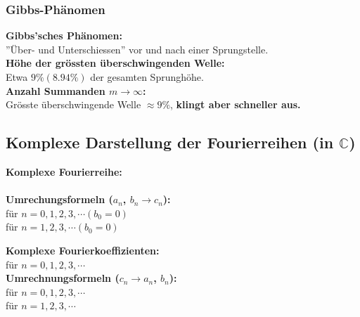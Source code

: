 			\subsubsection{Gibbs-Phänomen}
				\begin{minipage}[t]{0.65\textwidth}
					\textbf{Gibbs'sches Phänomen:}\\[3pt]
					''Über- und Unterschiessen'' vor und nach einer Sprungstelle.\\[3pt]
					\textbf{Höhe der grössten überschwingenden Welle:}\\[3pt]
					Etwa $9\% (8.94\%)$ der gesamten Sprunghöhe.\\[3pt]
					\textbf{Anzahl Summanden $m \rightarrow \infty$:}\\[3pt]
					Grösste überschwingende Welle $\approx 9\%$, \textbf{klingt aber schneller aus.}
				\end{minipage}
				\begin{minipage}[t]{0.35\textwidth}
				\end{minipage}
		
		\subsection{Komplexe Darstellung der Fourierreihen (in $\mathbb{C}$)}
			\begin{minipage}[t]{0.5\textwidth}
				\textbf{Komplexe Fourierreihe:}\\[3pt]
				\\[3pt]
				\textbf{Umrechungsformeln ($a_n$, $b_n \rightarrow c_n$):}\\[3pt]
				 für $n = 0, 1, 2, 3, \cdots (b_0 = 0)$\\[3pt]
				 für $n = 1, 2, 3, \cdots (b_0 = 0)$\\[3pt]
			\end{minipage}
			\begin{minipage}[t]{0.5\textwidth}
				\textbf{Komplexe Fourierkoeffizienten:}\\[3pt]
				 für $n = 0, 1, 2, 3, \cdots$\\[3pt]
				\textbf{Umrechnungsformeln ($c_n \rightarrow a_n$, $b_n$):}\\[3pt]
				 für $n = 0, 1, 2, 3, \cdots$\\[3pt]
				 für $n = 1, 2, 3, \cdots$\\[3pt]
			\end{minipage}
		

